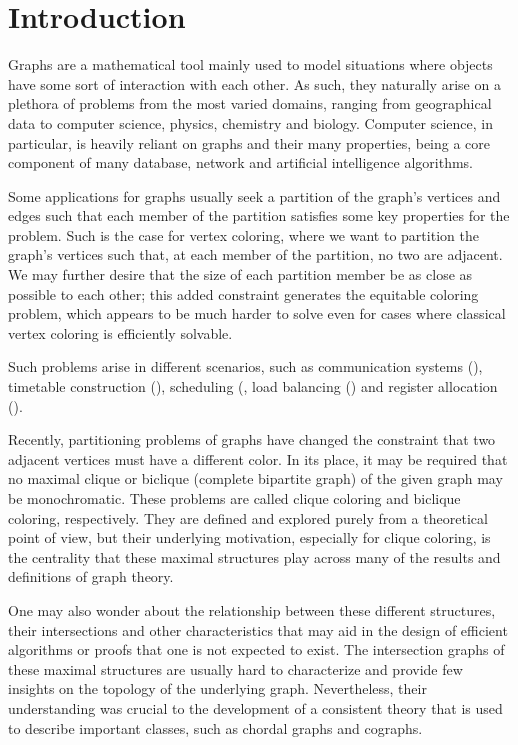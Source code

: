 \chapter{Introduction}
\label{ch:intro}

Graphs are a mathematical tool mainly used to model situations where objects have some sort of interaction with each other.
As such, they naturally arise on a plethora of problems from the most varied domains, ranging from geographical data to computer science, physics, chemistry and biology.
Computer science, in particular, is heavily reliant on graphs and their many properties, being a core component of many database, network and artificial intelligence algorithms.

Some applications for graphs usually seek a partition of the graph's vertices and edges such that each member of the partition satisfies some key properties for the problem.
Such is the case for vertex coloring, where we want to partition the graph's vertices such that, at each member of the partition, no two are adjacent.
We may further desire that the size of each partition member be as close as possible to each other; this added constraint generates the equitable coloring problem, which appears to be much harder to solve even for cases where classical vertex coloring is efficiently solvable.

Such problems arise in different scenarios, such as communication systems (\cite{traffic_scheduling}), timetable construction (\cite{timetable}), scheduling (\cite{mutual_exclusion_scheduling}, load balancing (\cite{domain_decomposition}) and register allocation (\cite{fernando_chordal}).

Recently, partitioning problems of graphs have changed the constraint that two adjacent vertices must have a different color.
In its place, it may be required that no maximal clique or biclique (complete bipartite graph) of the given graph may be monochromatic.
These problems are called clique coloring and biclique coloring, respectively.
They are defined and explored purely from a theoretical point of view, but their underlying motivation, especially for clique coloring, is the centrality that these maximal structures play across many of the results and definitions of graph theory.

One may also wonder about the relationship between these different structures, their intersections and other characteristics that may aid in the design of efficient algorithms or proofs that one is not expected to exist.
The intersection graphs of these maximal structures are usually hard to characterize and provide few insights on the topology of the underlying graph.
Nevertheless, their understanding was crucial to the development of a consistent theory that is used to describe important classes, such as chordal graphs and cographs.

